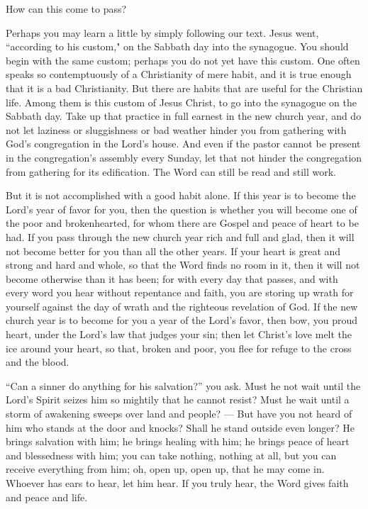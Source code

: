 How can this come to pass? 

Perhaps you may learn a little by simply following our text. Jesus went, “according to his custom," on the Sabbath day into the synagogue. You should begin with the same custom; perhaps you do not yet have this custom. One often speaks so contemptuously of a Christianity of mere habit, and it is true enough that it is a bad Christianity. But there are habits that are useful for the Christian life. Among them is this custom of Jesus Christ, to go into the synagogue on the Sabbath day. Take up that practice in full earnest in the new church year, and do not let laziness or sluggishness or bad weather hinder you from gathering with God’s congregation in the Lord’s house. And even if the pastor cannot be present in the congregation’s assembly every Sunday, let that not hinder the congregation from gathering for its edification. The Word can still be read and still work.

But it is not accomplished with a good habit alone. If this year is to become the Lord’s year of favor for you, then the question is whether you will become one of the poor and brokenhearted, for whom there are Gospel and peace of heart to be had. If you pass through the new church year rich and full and glad, then it will not become better for you than all the other years. If your heart is great and strong and hard and whole, so that the Word finds no room in it, then it will not become otherwise than it has been; for with every day that passes, and with every word you hear without repentance and faith, you are storing up wrath for yourself against the day of wrath and the righteous revelation of God. If the new church year is to become for you a year of the Lord’s favor, then bow, you proud heart, under the Lord’s law that judges your sin; then let Christ’s love melt the ice around your heart, so that, broken and poor, you flee for refuge to the cross and the blood.

“Can a sinner do anything for his salvation?” you ask. Must he not wait until the Lord’s Spirit seizes him so mightily that he cannot resist? Must he wait until a storm of awakening sweeps over land and people? — But have you not heard of him who stands at the door and knocks? Shall he stand outside even longer? He brings salvation with him; he brings healing with him; he brings peace of heart and blessedness with him; you can take nothing, nothing at all, but you can receive everything from him; oh, open up, open up, that he may come in. Whoever has ears to hear, let him hear. If you truly hear, the Word gives faith and peace and life.

